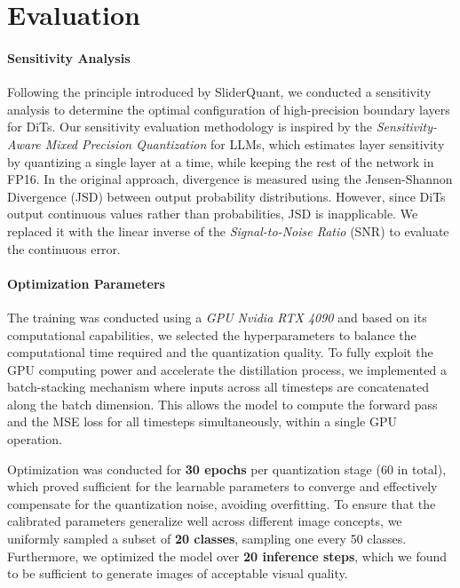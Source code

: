 \documentclass{article}
\begin{document}
\section{Evaluation}\label{sec:eval}

\paragraph{Sensitivity Analysis}

Following the principle introduced by SliderQuant, we conducted a sensitivity analysis to determine the optimal configuration of high-precision boundary layers for DiTs.
Our sensitivity evaluation methodology is inspired by the \textit{Sensitivity-Aware Mixed Precision Quantization} \cite{sensitivityanalysis} for LLMs, which estimates layer sensitivity by quantizing a single layer at a time, while keeping the rest of the network in FP16.
In the original approach, divergence is measured using the Jensen-Shannon Divergence (JSD) between output probability distributions. However, since DiTs output continuous values rather than probabilities, JSD is inapplicable.
We replaced it with the linear inverse of the \textit{Signal-to-Noise Ratio} (SNR) \cite{roux2018sdrhalfbakeddone} to evaluate the continuous error.


\paragraph{Optimization Parameters}

The training was conducted using a \textit{GPU Nvidia RTX 4090} and based on its computational capabilities, we selected the hyperparameters to balance the computational time required and the quantization quality.
To fully exploit the GPU computing power and accelerate the distillation process, we implemented a batch-stacking mechanism where inputs across all timesteps are concatenated along the batch dimension.
This allows the model to compute the forward pass and the MSE loss for all timesteps simultaneously, within a single GPU operation.


Optimization was conducted for \textbf{30 epochs} per quantization stage (60 in total), which proved sufficient for the learnable parameters to converge and effectively compensate for the quantization noise, avoiding overfitting.
To ensure that the calibrated parameters generalize well across different image concepts, we uniformly sampled a subset of \textbf{20 classes}, sampling one every 50 classes.
Furthermore, we optimized the model over \textbf{20 inference steps}, which we found to be sufficient to generate images of acceptable visual quality.
\end{document}

